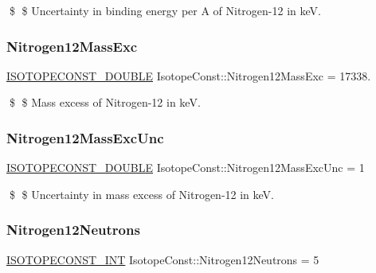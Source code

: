\$ \$ Uncertainty in binding energy per A of Nitrogen-\/12 in keV. \mbox{\label{group___isotope_const-_nitrogen-_n12_gacc38fd8c47aa8a0686dff65b7754a74e}} 
\subsubsection{\texorpdfstring{Nitrogen12\+Mass\+Exc}{Nitrogen12MassExc}}
{\footnotesize\ttfamily \mbox{\hyperlink{group___isotope_const-_macros_ga8f45a7272ce02c0b4c65c44636ed719a}{I\+S\+O\+T\+O\+P\+E\+C\+O\+N\+S\+T\+\_\+\+D\+O\+U\+B\+LE}} Isotope\+Const\+::\+Nitrogen12\+Mass\+Exc = 17338.}

\$ \$ Mass excess of Nitrogen-\/12 in keV. \mbox{\label{group___isotope_const-_nitrogen-_n12_ga2586728a5c52800aa60a7fc0d539ca75}} 
\subsubsection{\texorpdfstring{Nitrogen12\+Mass\+Exc\+Unc}{Nitrogen12MassExcUnc}}
{\footnotesize\ttfamily \mbox{\hyperlink{group___isotope_const-_macros_ga8f45a7272ce02c0b4c65c44636ed719a}{I\+S\+O\+T\+O\+P\+E\+C\+O\+N\+S\+T\+\_\+\+D\+O\+U\+B\+LE}} Isotope\+Const\+::\+Nitrogen12\+Mass\+Exc\+Unc = 1}

\$ \$ Uncertainty in mass excess of Nitrogen-\/12 in keV. \mbox{\label{group___isotope_const-_nitrogen-_n12_ga7821defadc3cde53132e710d1663ec83}} 
\subsubsection{\texorpdfstring{Nitrogen12\+Neutrons}{Nitrogen12Neutrons}}
{\footnotesize\ttfamily \mbox{\hyperlink{group___isotope_const-_macros_ga5f18360b3e99483a35c32d789e62621c}{I\+S\+O\+T\+O\+P\+E\+C\+O\+N\+S\+T\+\_\+\+I\+NT}} Isotope\+Const\+::\+Nitrogen12\+Neutrons = 5}

